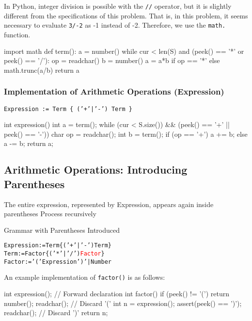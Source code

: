 In Python, integer division is possible with the \texttt{//} operator, but it is slightly different from the specifications of this problem. That is, in this problem, it seems necessary to evaluate \texttt{3/-2} as -1 instead of -2. Therefore, we use the \texttt{math.} function.
\begin{pybox}[emph={term},emph={[2]number,*,/}]
import math
def term():
    a = number()
    while cur < len(S) and (peek() == '*' or peek() == '/'):
        op = readchar()
        b = number()
        a = a*b if op == '*' else math.trunc(a/b)
    return a
\end{pybox}
  
\subsubsection{Implementation of Arithmetic Operations (Expression)}
\texttt{\textcolor{ired}{Expression := Term \{ ('+'|'-') Term \}}}

  \begin{cbox}[emph={expression},emph={[2]term,+,-}]
int expression() {
  int a = term();
  while (cur < S.size())
      && (peek() == '+' || peek() == '-')) {
    char op = readchar();
    int b = term();
    if (op == '+') a += b; else a -= b;
  }
  return a;
}
\end{cbox}
\subsection{Arithmetic Operations: Introducing Parentheses}
The entire expression, represented by Expression, appears again inside parentheses \dingright Process recursively

\begin{itembox}[l]{Grammar with Parentheses Introduced}
  \begin{alltt}
Expression := Term \{ ('+'|'-') Term \}
Term := \textcolor{ired}{Factor} \{ ('*'|'/') \textcolor{red}{Factor} \}
\textcolor{ired}{Factor := '(' Expression ')' | Number}
\end{alltt}
\end{itembox}

An example implementation of \texttt{factor()} is as follows:
  \begin{cbox}[emph={factor},emph={[2]number,expression}]
int expression(); // Forward declaration
int factor() {
  if (peek() != '(') return number();
  readchar(); // Discard '('
  int n = expression();
  assert(peek() == ')');
  readchar(); // Discard ')'
  return n;
}
\end{cbox}

